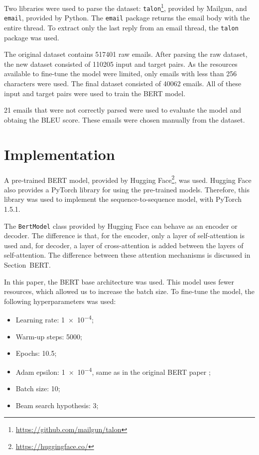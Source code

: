 \documentclass[letterpaper]{article}
\begin{document}
Two libraries were used to parse the dataset: \texttt{talon}\footnote{\href{https://github.com/mailgun/talon}{https://github.com/mailgun/talon}}, provided by Mailgun, and \texttt{email}, provided by Python. The \texttt{email} package returns the email body with the entire thread. To extract only the last reply from an email thread, the \texttt{talon} package was used.

The original dataset contains \num{517401} raw emails. After parsing the raw dataset, the new dataset consisted of \num{110205} input and target pairs. As the resources available to fine-tune the model were limited,  only emails with less than \num{256} characters were used. The final dataset consisted of \num{40062} emails. All of these input and target pairs were used to train the BERT model.

\num{21} emails that were not correctly parsed were used to evaluate the model and obtaing the BLEU score. These emails were chosen manually from the dataset.


\section{Implementation}

A pre-trained BERT model, provided by Hugging Face\footnote{\href{https://huggingface.co/}{https://huggingface.co/}}, was used. Hugging Face also provides a PyTorch library for using the pre-trained models. Therefore, this library was used to implement the sequence-to-sequence model, with PyTorch 1.5.1.

The \texttt{BertModel} class provided by Hugging Face can behave as an encoder or decoder. The difference is that, for the encoder, only a layer of self-attention is used and, for decoder, a layer of cross-attention is added between the layers of self-attention. The difference between these attention mechanisms is discussed in Section~BERT.

In this paper, the BERT base architecture was used. This model uses fewer resources, which allowed us to increase the batch size. To fine-tune the model, the following hyperparameters was used:

\begin{itemize}
    \item Learning rate: \num{1e-4};
    \item Warm-up steps: \num{5000};
    \item Epochs: \num{10.5};
    \item Adam epsilon: \num{1e-4}, same as in the original BERT paper \cite{DBLP:journals/corr/abs-1810-04805};
    \item Batch size: \num{10};
    \item Beam search hypothesis: \num{3};
\end{itemize}
\end{document}
